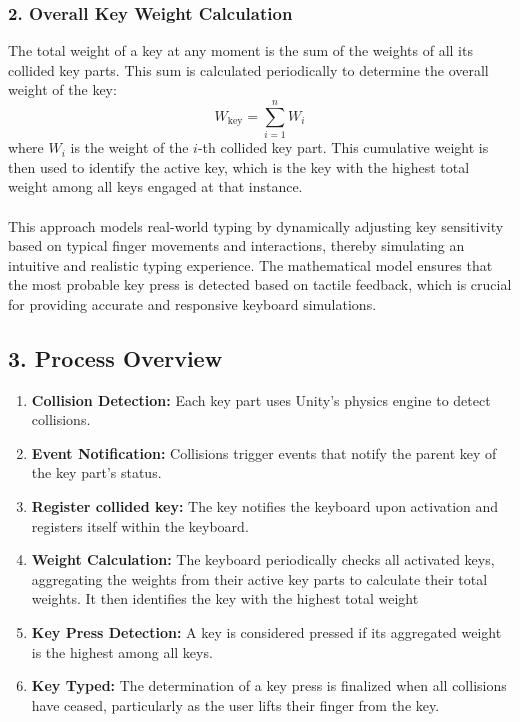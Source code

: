 \subsubsection*{2. Overall Key Weight Calculation}
The total weight of a key at any moment is the sum of the weights of all its collided key parts. This sum is calculated periodically to determine the overall weight of the key:
\begin{equation}
W_{\text{key}} = \sum_{i=1}^{n} W_i
\end{equation}
where $W_i$ is the weight of the $i$-th collided key part. This cumulative weight is then used to identify the active key, which is the key with the highest total weight among all keys engaged at that instance.\\ \\
This approach models real-world typing by dynamically adjusting key sensitivity based on typical finger movements and interactions, thereby simulating an intuitive and realistic typing experience. The mathematical model ensures that the most probable key press is detected based on tactile feedback, which is crucial for providing accurate and responsive keyboard simulations.

\subsection*{3. Process Overview}
\begin{enumerate}
    \item \textbf{Collision Detection:} Each key part uses Unity's physics engine to detect collisions.
    \item \textbf{Event Notification:} Collisions trigger events that notify the parent key of the key part's status.
       \item \textbf{Register collided key:}
    The key notifies the keyboard upon activation and registers itself within the keyboard.
       
    \item \textbf{Weight Calculation:} The keyboard periodically checks all activated keys, aggregating the weights from their active key parts to calculate their total weights. It then identifies the key with the highest total weight
    
    \item \textbf{Key Press Detection:} A key is considered pressed if its aggregated weight is the highest among all keys.
    \item \textbf{Key Typed:} The determination of a key press is finalized when all collisions have ceased, particularly as the user lifts their finger from the key.
\end{enumerate}





